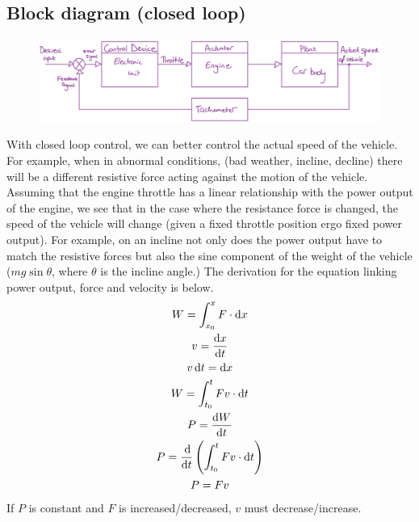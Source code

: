 \documentclass[12pt]{article}
\numberwithin{equation}{section}
\begin{document}
\subsection{Block diagram (closed loop)}
\begin{figure}[H]
  \centering
  \includegraphics[width=\textwidth]{./img/1-2blockdiagram.png}
\end{figure}
With closed loop control, we can better control the actual speed of the vehicle. For example, when in abnormal conditions, (bad weather, incline, decline) there will be a different resistive force acting against the motion of the vehicle. Assuming that the engine throttle has a linear relationship with the power output of the engine, we see that in the case where the resistance force is changed, the speed of the vehicle will change (given a fixed throttle position ergo fixed power output). For example, on an incline not only does the power output have to match the resistive forces but also the sine component of the weight of the vehicle ($mg\sin{\theta}$, where $\theta$ is the incline angle.) The derivation for the equation linking power output, force and velocity is below.
\begin{gather}
  W = \int_{x_0}^{x} F \cdot \textrm{d}x\\
  v = \frac{\dif x}{\dif t}\\
  v\dif t = \dif x\\
  W = \int_{t_0}^{t} Fv\cdot \textrm{d} t\\
  P = \frac{\dif W}{\dif t}\\
  P = \frac{\dif}{\dif t}\left(\int_{t_0}^{t} Fv\cdot \textrm{d} t\right)\\
  P = Fv
\end{gather}
If $P$ is constant and $F$ is increased/decreased, $v$ must decrease/increase.
\end{document}
